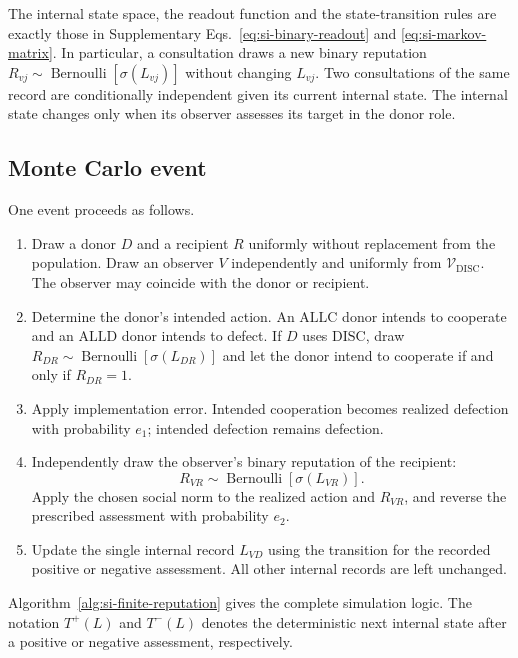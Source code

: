 \documentclass[fleqn,10pt]{wlscirep}
\begin{document}
The internal state space, the readout function and the state-transition rules are exactly those in Supplementary Eqs.~\eqref{eq:si-binary-readout} and \eqref{eq:si-markov-matrix}. In particular, a consultation draws a new binary reputation $R_{vj}\sim\operatorname{Bernoulli}[\sigma(L_{vj})]$ without changing $L_{vj}$. Two consultations of the same record are conditionally independent given its current internal state. The internal state changes only when its observer assesses its target in the donor role.

\subsection{Monte Carlo event}
\label{sec:si-monte-carlo-event}

One event proceeds as follows.

\begin{enumerate}
\item Draw a donor $D$ and a recipient $R$ uniformly without replacement from the population. Draw an observer $V$ independently and uniformly from $\mathcal V_{\mathrm{DISC}}$. The observer may coincide with the donor or recipient.

\item Determine the donor's intended action. An $\mathrm{ALLC}$ donor intends to cooperate and an $\mathrm{ALLD}$ donor intends to defect. If $D$ uses $\mathrm{DISC}$, draw $R_{DR}\sim\operatorname{Bernoulli}[\sigma(L_{DR})]$ and let the donor intend to cooperate if and only if $R_{DR}=1$.

\item Apply implementation error. Intended cooperation becomes realized defection with probability $e_1$; intended defection remains defection.

\item Independently draw the observer's binary reputation of the recipient:
\[
R_{VR}\sim\operatorname{Bernoulli}[\sigma(L_{VR})].
\]
Apply the chosen social norm to the realized action and $R_{VR}$, and reverse the prescribed assessment with probability $e_2$.

\item Update the single internal record $L_{VD}$ using the transition for the recorded positive or negative assessment. All other internal records are left unchanged.
\end{enumerate}

Algorithm~\ref{alg:si-finite-reputation} gives the complete simulation logic. The notation $T^+(L)$ and $T^-(L)$ denotes the deterministic next internal state after a positive or negative assessment, respectively.
\end{document}
